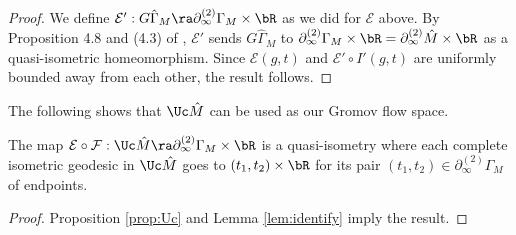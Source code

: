 \begin{proof}
	We define 
$\mathcal{E}': G\hat{\Gamma}_M \ra \partial_\infty^{(2)} \Gamma_M \times \bR$ 
	as we did for $\mathcal{E}$ above. 
	By Proposition 4.8 and (4.3) of \cite{Champetier94}, 
	$\mathcal{E}'$ sends 
	$G\hat{\Gamma}_M$ to 
	$\partial_\infty^{(2)} \Gamma_M \times \bR
	= \partial_\infty^{(2)} \hat{M}\times \bR$ as a quasi-isometric homeomorphism. 
	Since $\mathcal{E}(g, t)$ and $\mathcal{E}'\circ I'(g, t)$ are uniformly bounded away from 
	each other,  the result follows. 
\end{proof}


The following shows that $\Uc\hat{M}$ can be 
used as our Gromov flow space. 

\begin{theorem}\label{thm:identify} 
	The map	
	$\mathcal{E}\circ \mathcal{F}:\Uc \hat M \ra \partial_\infty^{(2)} \Gamma_M \times \bR$ 
	is a quasi-isometry where each complete isometric 
	geodesic in $\Uc \hat M$ goes to 
	$(t_1,t_2)\times \bR$ for its pair $(t_1, t_2)\in \partial_\infty^{(2)} \Gamma_M$ 
    of endpoints. 
\end{theorem} 
\begin{proof} 
	Proposition \ref{prop:Uc} and Lemma \ref{lem:identify} imply
	the result. %
\end{proof} 




